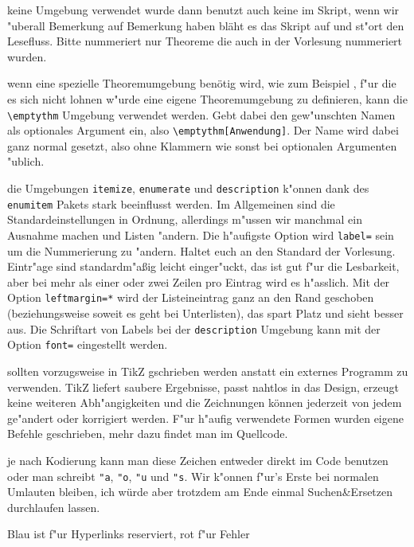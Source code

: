 \documentclass[paper=A4, twoside, chapterprefix=true, bibliography=totoc, headsepline]{scrbook}
\begin{document}
\begin{description}[font=\normalfont\itshape]
    keine Umgebung verwendet wurde dann benutzt auch keine im Skript,
    wenn wir "uberall Bemerkung auf Bemerkung haben bläht es das
    Skript auf und st"ort den Lesefluss. Bitte nummeriert nur Theoreme
    die auch in der Vorlesung nummeriert wurden.
  \item[Spezielle Theoreme:] wenn eine spezielle Theoremumgebung
    benötig wird, wie zum Beispiel , f"ur die es sich
    nicht lohnen w"urde eine eigene Theoremumgebung zu definieren,
    kann die \verb|\emptythm| Umgebung verwendet werden. Gebt dabei
    den gew"unschten Namen als optionales Argument ein, also
    \verb|\emptythm[Anwendung]|. Der Name wird dabei ganz normal
    gesetzt, also ohne Klammern wie sonst bei optionalen Argumenten
    "ublich.
  \item[Listen und Aufz"ahlungen:] die Umgebungen \verb|itemize|,
    \verb|enumerate| und \verb|description| k"onnen dank des
    \verb|enumitem| Pakets stark beeinflusst werden. Im Allgemeinen
    sind die Standardeinstellungen in Ordnung, allerdings m"ussen wir
    manchmal ein Ausnahme machen und Listen "andern. Die h"aufigste
    Option wird \verb|label=| sein um die Nummerierung zu
    "andern. Haltet euch an den Standard der Vorlesung. Eintr"age sind
    standardm"a\ss ig leicht einger"uckt, das ist gut f"ur die
    Lesbarkeit, aber bei mehr als einer oder zwei Zeilen pro Eintrag
    wird es h"asslich. Mit der Option \verb|leftmargin=*| wird der
    Listeineintrag ganz an den Rand geschoben (beziehungsweise soweit
    es geht bei Unterlisten), das spart Platz und sieht besser
    aus. Die Schriftart von Labels bei der \verb|description| Umgebung
    kann mit der Option \verb|font=| eingestellt werden.
  \item[Zeichungen:] sollten vorzugsweise in TikZ gschrieben werden
    anstatt ein externes Programm zu verwenden. TikZ liefert saubere
    Ergebnisse, passt nahtlos in das Design, erzeugt keine weiteren
    Abh"angigkeiten und die Zeichnungen können jederzeit von jedem
    ge"andert oder korrigiert werden. F"ur h"aufig verwendete Formen
    wurden eigene Befehle geschrieben, mehr dazu findet man im
    Quellcode.
  \item[Umlaute und "s:] je nach Kodierung kann man diese Zeichen
    entweder direkt im Code benutzen oder man schreibt \verb|"a|,
    \verb|"o|, \verb|"u| und \verb|"s|. Wir k"onnen f"ur's Erste bei
    normalen Umlauten bleiben, ich würde aber trotzdem am Ende einmal
    Suchen\&Ersetzen durchlaufen lassen.
  \item[Farben:] Blau ist f"ur Hyperlinks reserviert, rot f"ur Fehler

\end{description}
\end{document}
